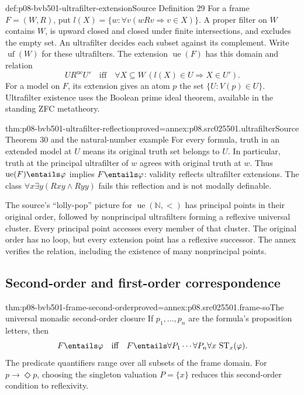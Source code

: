 \begin{hbdefinition}{def:p08-bvb501-ultrafilter-extension}{Source Definition 29}
For a frame \(F=(W,R)\), put
\(l(X)=\{w:\forall v(wRv\Rightarrow v\in X)\}\).
A proper filter on \(W\) contains \(W\), is upward closed and
closed under finite intersections, and excludes the empty set.
An ultrafilter decides each subset against its complement. Write
\(\operatorname{uf}(W)\) for these ultrafilters. The extension
\(\operatorname{ue}(F)\) has this domain and relation
\[
 U R^{\mathrm{ue}}U'\quad\text{iff}\quad
 \forall X\subseteq W\,(l(X)\in U\Rightarrow X\in U').
\]
For a model on \(F\), its extension gives an atom \(p\) the set
\(\{U:V(p)\in U\}\). Ultrafilter existence uses the Boolean
prime ideal theorem, available in the standing ZFC metatheory.
\end{hbdefinition}

\begin{hbtheorem}{thm:p08-bvb501-ultrafilter-reflection}{proved=annex:p08.src025501.ultrafilter}{Source Theorem 30 and the natural-number example}
For every formula, truth in an extended model at \(U\) means its
original truth set belongs to \(U\). In particular, truth at the
principal ultrafilter of \(w\) agrees with original truth at \(w\).
Thus \(\operatorname{ue}(F)\entails\varphi\) implies
\(F\entails\varphi\): validity reflects ultrafilter extensions.
The class \(\forall x\exists y(Rxy\land Ryy)\) fails this
reflection and is not modally definable.
\end{hbtheorem}

The source's ``lolly-pop'' picture for \(\operatorname{ue}(\mathbb N,<)\)
has principal points in their original order, followed by nonprincipal
ultrafilters forming a reflexive universal cluster. Every principal point
accesses every member of that cluster. The original order has no loop,
but every extension point has a reflexive successor. The annex verifies
the relation, including the existence of many nonprincipal points.

\subsection{Second-order and first-order correspondence}
\label{sec:p08-bvb501-correspondence}

\begin{hbtheorem}{thm:p08-bvb501-frame-second-order}{proved=annex:p08.src025501.frame-so}{The universal monadic second-order closure}
If \(p_1,\ldots,p_n\) are the formula's proposition letters, then
\[
 F\entails\varphi\quad\text{iff}\quad
 F\entails\forall P_1\cdots\forall P_n\forall x\,
       \operatorname{ST}_x(\varphi).
\]
The predicate quantifiers range over all subsets of the frame domain.
For \(p\to\Diamond p\), choosing the singleton valuation
\(P=\{x\}\) reduces this second-order condition to reflexivity.
\end{hbtheorem}

